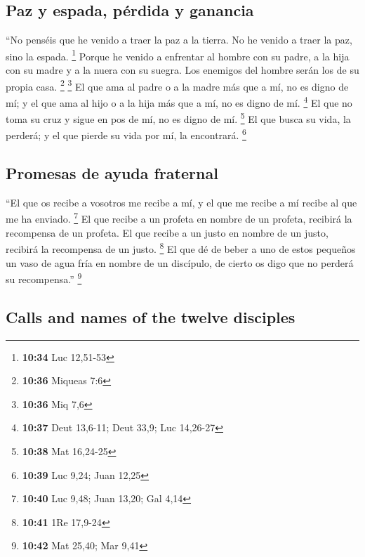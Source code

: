 \begin{paracol}{2}
\hypertarget{paz-y-espada-puxe9rdida-y-ganancia}{%
\subsection{Paz y espada, pérdida y
ganancia}\label{paz-y-espada-puxe9rdida-y-ganancia}}

 ``No penséis que he venido a traer la paz a la tierra.
No he venido a traer la paz, sino la espada. \footnote{\textbf{10:34}
  Luc 12,51-53}  Porque he venido a enfrentar al hombre
con su padre, a la hija con su madre y a la nuera con su suegra.
 Los enemigos del hombre serán los de su propia casa.
\footnote{\textbf{10:36} Miqueas 7:6} \footnote{\textbf{10:36} Miq 7,6}
 El que ama al padre o a la madre más que a mí, no es
digno de mí; y el que ama al hijo o a la hija más que a mí, no es digno
de mí. \footnote{\textbf{10:37} Deut 13,6-11; Deut 33,9; Luc 14,26-27}
 El que no toma su cruz y sigue en pos de mí, no es digno
de mí. \footnote{\textbf{10:38} Mat 16,24-25}  El que
busca su vida, la perderá; y el que pierde su vida por mí, la
encontrará. \footnote{\textbf{10:39} Luc 9,24; Juan 12,25}

\hypertarget{promesas-de-ayuda-fraternal}{%
\subsection{Promesas de ayuda
fraternal}\label{promesas-de-ayuda-fraternal}}

 ``El que os recibe a vosotros me recibe a mí, y el que
me recibe a mí recibe al que me ha enviado. \footnote{\textbf{10:40} Luc
  9,48; Juan 13,20; Gal 4,14}  El que recibe a un profeta
en nombre de un profeta, recibirá la recompensa de un profeta. El que
recibe a un justo en nombre de un justo, recibirá la recompensa de un
justo. \footnote{\textbf{10:41} 1Re 17,9-24}  El que dé
de beber a uno de estos pequeños un vaso de agua fría en nombre de un
discípulo, de cierto os digo que no perderá su recompensa.'' \footnote{\textbf{10:42}
  Mat 25,40; Mar 9,41}

\switchcolumn
\begin{otherlanguage}{english}

\hypertarget{calls-and-names-of-the-twelve-disciples}{%
\subsection{Calls and names of the twelve
disciples}\label{calls-and-names-of-the-twelve-disciples}}


\end{otherlanguage}
\end{paracol}
